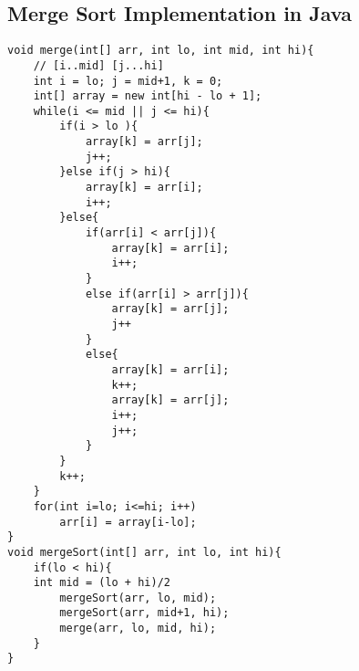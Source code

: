 \documentclass{article}
\begin{document}
\subsection{Merge Sort Implementation in Java} 
\lstset{language=Java}
\begin{lstlisting}[frame=single]
void merge(int[] arr, int lo, int mid, int hi){
    // [i..mid] [j...hi]
    int i = lo; j = mid+1, k = 0;
    int[] array = new int[hi - lo + 1];
    while(i <= mid || j <= hi){
        if(i > lo ){            
            array[k] = arr[j];
            j++;
        }else if(j > hi){
            array[k] = arr[i];
            i++;
        }else{
            if(arr[i] < arr[j]){
                array[k] = arr[i];
                i++;
            }
            else if(arr[i] > arr[j]){
                array[k] = arr[j];
                j++
            }
            else{
                array[k] = arr[i];
                k++;
                array[k] = arr[j];
                i++;
                j++;
            }
        }
        k++;
    }
    for(int i=lo; i<=hi; i++)
        arr[i] = array[i-lo];
}
void mergeSort(int[] arr, int lo, int hi){
    if(lo < hi){
    int mid = (lo + hi)/2
        mergeSort(arr, lo, mid);
        mergeSort(arr, mid+1, hi);
        merge(arr, lo, mid, hi);
    }
}
\end{lstlisting} 
\end{document}
